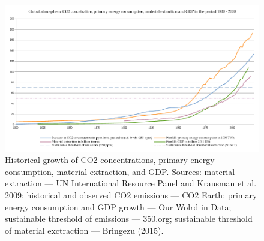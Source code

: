 \documentclass[a4paper, nobind]{templates/ociamthesis}
\begin{document}
\begin{figure}
\includegraphics[width=1\linewidth]{./figures/energy_emissions_extraction_GDP} \caption[Historical emissions, energy consumption, material extraction, and GDP]{Historical growth of CO2 concentrations, primary energy consumption, material extraction, and GDP. Sources: material extraction — UN International Resource Panel and Krausman et al. 2009; historical and observed CO2 emissions — CO2 Earth; primary energy consumption and GDP growth — Our Wolrd in Data; sustainable threshold of emissions — 350.org; sustainable threshold of material exctraction — Bringezu (2015).}\label{fig:unnamed-chunk-2}
\end{figure}
\end{document}
